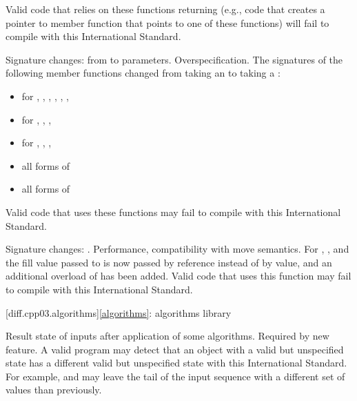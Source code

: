 Valid \CppIII{} code that relies on these functions returning 
(e.g., code that creates a pointer to member function that points to one
of these functions) will fail to compile with this International Standard.

\change
Signature changes: from  to 
parameters.
\rationale
Overspecification.
\effect
The signatures of the following member functions changed from taking an
 to taking a :

\begin{itemize}
\item {} for , , ,
, , , 
\item {} for , , ,
\item {} for , , , 
\item all forms of 
\item all forms of 
\end{itemize}

Valid \CppIII{} code that uses these functions may fail to compile with this
International Standard.

\change
Signature changes: .
\rationale
Performance, compatibility with move semantics.
\effect
For , , and 
the fill value passed to  is now passed by reference instead of
by value, and an additional overload of  has been added. Valid
\CppIII{} code that uses this function may fail to compile with this International
Standard.

[diff.cpp03.algorithms]{\ref{algorithms}: algorithms library}

\change
Result state of inputs after application of some algorithms.
\rationale
Required by new feature.
\effect
A valid \CppIII{} program may detect that an object with a valid but
unspecified state has a different valid but unspecified state with this
International Standard. For example,  and
 may leave the tail of the input sequence with a
different set of values than previously.

